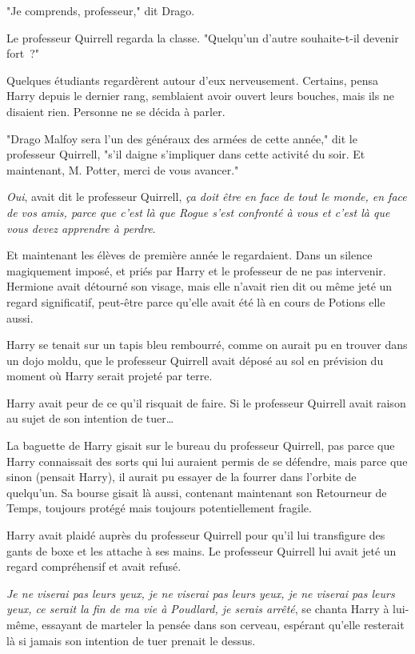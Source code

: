"Je comprends, professeur," dit Drago.

Le professeur Quirrell regarda la classe. "Quelqu'un d'autre souhaite-t-il devenir fort~?"

Quelques étudiants regardèrent autour d'eux nerveusement. Certains, pensa Harry depuis le dernier rang, semblaient avoir ouvert leurs bouches, mais ils ne disaient rien. Personne ne se décida à parler.

"Drago Malfoy sera l'un des généraux des armées de cette année," dit le professeur Quirrell, "s'il daigne s'impliquer dans cette activité du soir. Et maintenant, M. Potter, merci de vous avancer."

\later

\emph{Oui}, avait dit le professeur Quirrell, \emph{ça doit être en face de tout le monde, en face de vos amis, parce que c'est là que Rogue s'est confronté à vous et c'est là que vous devez apprendre à perdre}.

Et maintenant les élèves de première année le regardaient. Dans un silence magiquement imposé, et priés par Harry et le professeur de ne pas intervenir. Hermione avait détourné son visage, mais elle n'avait rien dit ou même jeté un regard significatif, peut-être parce qu'elle avait été là en cours de Potions elle aussi.

Harry se tenait sur un tapis bleu rembourré, comme on aurait pu en trouver dans un dojo moldu, que le professeur Quirrell avait déposé au sol en prévision du moment où Harry serait projeté par terre.

Harry avait peur de ce qu'il risquait de faire. Si le professeur Quirrell avait raison au sujet de son intention de tuer…

La baguette de Harry gisait sur le bureau du professeur Quirrell, pas parce que Harry connaissait des sorts qui lui auraient permis de se défendre, mais parce que sinon (pensait Harry), il aurait pu essayer de la fourrer dans l'orbite de quelqu'un. Sa bourse gisait là aussi, contenant maintenant son Retourneur de Temps, toujours protégé mais toujours potentiellement fragile.

Harry avait plaidé auprès du professeur Quirrell pour qu'il lui transfigure des gants de boxe et les attache à ses mains. Le professeur Quirrell lui avait jeté un regard compréhensif et avait refusé.

\emph{Je ne viserai pas leurs yeux, je ne viserai pas leurs yeux, je ne viserai pas leurs yeux, ce serait la fin de ma vie à Poudlard, je serais arrêté}, se chanta Harry à lui-même, essayant de marteler la pensée dans son cerveau, espérant qu'elle resterait là si jamais son intention de tuer prenait le dessus.

